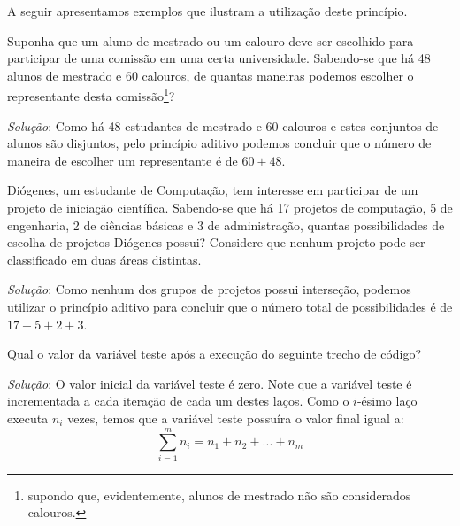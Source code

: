 A seguir apresentamos exemplos que ilustram a utilização deste
princípio.

\begin{Example}
Suponha que um aluno de mestrado ou um calouro deve ser escolhido para
participar de uma comissão em uma certa universidade. Sabendo-se que
há 48 alunos de mestrado e 60 calouros, de quantas maneiras podemos
escolher o representante desta comissão\footnote{supondo que, evidentemente,
alunos de mestrado não são considerados calouros.}?

\textit{Solução}: Como há 48 estudantes de mestrado e 60 calouros e
estes conjuntos de alunos são disjuntos, pelo princípio aditivo
podemos concluir que o número de maneira de escolher um representante
é de $60 + 48$.
\end{Example}

\begin{Example}
Diógenes, um estudante de Computação, tem interesse em participar de
um projeto de iniciação científica. Sabendo-se que há 17 projetos de
computação, 5 de engenharia, 2 de ciências básicas e 3 de
administração, quantas possibilidades de escolha de projetos Diógenes
possui? Considere que nenhum projeto pode ser classificado em duas
áreas distintas.

\textit{Solução}: Como nenhum dos grupos de projetos possui
interseção, podemos utilizar o princípio aditivo para concluir que o
número total de possibilidades é de $17 + 5 + 2 + 3$.
\end{Example}

\begin{Example}
Qual o valor da variável teste após a execução do seguinte trecho de
código?
\begin{algorithm}
  \begin{algorithmic}[0]
      \EndFor
      \EndFor
      \State{$\vdots$}
      \EndFor
  \end{algorithmic}
\end{algorithm}

\textit{Solução}: O valor inicial da variável teste é zero. Note que a
variável teste é incrementada a cada iteração de cada um destes
laços. Como o $i$-ésimo laço executa $n_i$ vezes, temos que a variável
teste possuíra o valor final igual a:
\[
\sum_{i=1}^mn_i = n_1 + n_2 + ... +n_m
\]
\end{Example}

